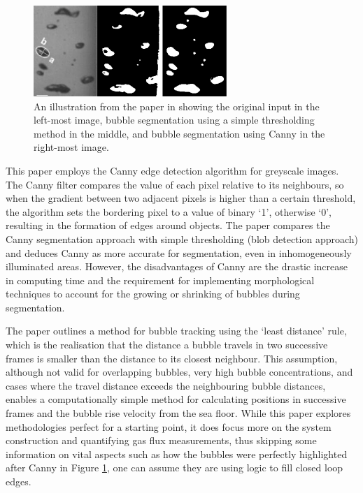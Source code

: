 \begin{figure}[h]
    \centering
    \includegraphics[width=0.65\textwidth]{assets/bubble-segmentation-canny-thresholding.png}
    \caption{An illustration from the paper in \cite{thomanekAutomatedGasBubble2010} showing the original input in the left-most image, bubble segmentation using a simple thresholding method in the middle, and bubble segmentation using Canny in the right-most image.}
    \label{fig:bubble_segment_canny}
\end{figure}

This paper employs the Canny edge detection algorithm \cite{cannyComputationalApproachEdge1986} for greyscale images. The Canny filter compares the value of each pixel relative to its neighbours, so when the gradient between two adjacent pixels is higher than a certain threshold, the algorithm sets the bordering pixel to a value of binary `1', otherwise `0', resulting in the formation of edges around objects. The paper compares the Canny segmentation approach with simple thresholding (blob detection approach) and deduces Canny as more accurate for segmentation, even in inhomogeneously illuminated areas. However, the disadvantages of Canny are the drastic increase in computing time and the requirement for implementing morphological techniques to account for the growing or shrinking of bubbles during segmentation.

The paper outlines a method for bubble tracking using the `least distance' rule, which is the realisation that the distance a bubble travels in two successive frames is smaller than the distance to its closest neighbour. This assumption, although not valid for overlapping bubbles, very high bubble concentrations, and cases where the travel distance exceeds the neighbouring bubble distances, enables a computationally simple method for calculating positions in successive frames and the bubble rise velocity from the sea floor. While this paper explores methodologies perfect for a starting point, it does focus more on the system construction and quantifying gas flux measurements, thus skipping some information on vital aspects such as how the bubbles were perfectly highlighted after Canny in Figure \ref{fig:bubble_segment_canny}, one can assume they are using logic to fill closed loop edges.

